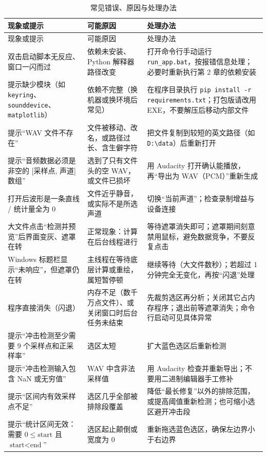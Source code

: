 \documentclass[UTF8,a4paper,12pt,scheme=chinese]{ctexart}
\begin{document}
{\small
\begin{longtable}{@{}>{\raggedright\arraybackslash}p{}>{\raggedright\arraybackslash}p{}>{\raggedright\arraybackslash}p{}@{}}
\caption{常见错误、原因与处理办法}\\
\toprule
现象或提示 & 可能原因 & 处理办法 \\
\midrule
\endfirsthead
\toprule
现象或提示 & 可能原因 & 处理办法 \\
\midrule
\endhead
\bottomrule
\endfoot
双击启动脚本无反应、窗口一闪而过 & 依赖未安装、Python 解释器路径改变 & 打开命令行手动运行 \texttt{run\_app.bat}，按报错信息处理；必要时重新执行第 2 章的依赖安装 \\
提示缺少模块（如 \texttt{keyring}、\texttt{sounddevice}、\texttt{matplotlib}） & 依赖不完整（换机器或换环境后常见） & 在程序目录执行 \texttt{pip install -r requirements.txt}；打包版请改用 EXE，不要解压后移动内部文件 \\
提示“WAV 文件不存在” & 文件被移动、改名，或路径过长、含生僻字符 & 把文件复制到较短的英文路径（如 \texttt{D:\textbackslash data}）后重新打开 \\
提示“音频数据必须是非空的 [采样点, 声道] 数组” & 选到了只有文件头的空 WAV，或文件已损坏 & 用 Audacity 打开确认能播放，再“导出为 WAV（PCM）”重新生成 \\
打开后波形是一条直线 / 统计量全为 0 & 文件近乎静音，或实际不是所选声道 & 切换“当前声道”；检查录制增益与设备连接 \\
大文件点击“检测并预览”后界面变灰、遮罩在转 & 正常现象：计算在后台线程进行 & 等待遮罩消失即可；遮罩期间刻意禁用鼠标，避免数据竞争，不要反复点击 \\
Windows 标题栏显示“未响应”，但遮罩仍在转 & 主线程在等待底层计算或重绘，属短暂停顿 & 继续等待（大文件数秒）；若超过 1 分钟完全无变化，再按“闪退”处理 \\
程序直接消失（闪退） & 内存不足（数千万点文件）、或关闭窗口时后台任务未结束 & 先裁剪选区再分析；关闭其它占内存程序；退出前等遮罩消失；命令行启动可见具体异常 \\
提示“冲击检测至少需要 9 个采样点和正采样率” & 选区太短 & 扩大蓝色选区后重新检测 \\
提示“冲击检测输入包含 NaN 或无穷值” & WAV 中含非法采样值 & 用 Audacity 检查并重新导出；不要用二进制编辑器手工修补 \\
提示“区间内有效采样点不足” & 选区几乎全部被排除段覆盖 & 降低“最长修复”以外的排除范围，或提高阈值重新检测；也可缩小选区避开冲击段 \\
提示“统计区间无效：需要 $0 \leq \text{start}$ 且 $\text{start} < \text{end}$” & 选区起止颠倒或宽度为 0 & 重新拖选蓝色选区，确保左边界小于右边界 \\

\end{longtable}}
\end{document}
